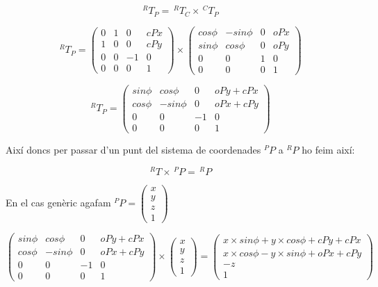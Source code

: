 $$ ^RT_P = \,^RT_C \times \,^CT_P $$

$$ ^RT_P = 
\left( \begin{array}{ccc|c}
0 & 1 &  0 & cPx\\
1 & 0 &  0 & cPy\\
0 & 0 & -1 &   0\\
\hline
0 & 0 &  0 & 1
\end{array} \right) \times
\left( \begin{array}{ccc|c}
cos \phi & -sin \phi &  0 & oPx\\
sin \phi &  cos \phi &  0 & oPy\\
0        &         0 &  1 &   0\\
\hline
0 & 0 &  0 & 1
\end{array} \right) $$

$$ ^RT_P = 
\left( \begin{array}{ccc|c}
sin \phi &  cos \phi &  0 & oPy + cPx\\
cos \phi & -sin \phi &  0 & oPx + cPy\\
0        &         0 & -1 &   0\\
\hline
0 & 0 &  0 & 1
\end{array} \right)$$

Així doncs per passar d'un punt del sistema de coordenades $^PP$ a $^RP$ ho
feim així:

$$^RT \times \,^PP = \,^RP$$

En el cas genèric agafam $^PP = 
\left( \begin{array}{c}
x \\
y \\
z \\
\hline
1
\end{array} \right)$

$$
\left( \begin{array}{ccc|c}
sin \phi &  cos \phi &  0 & oPy + cPx\\
cos \phi & -sin \phi &  0 & oPx + cPy\\
0        &         0 & -1 &   0\\
\hline
0 & 0 &  0 & 1
\end{array} \right)
\times
\left( \begin{array}{c}
x \\
y \\
z \\
\hline
1
\end{array} \right)
=
\left( \begin{array}{c}
x\times sin \phi + y \times cos \phi + cPy + cPx \\
x\times cos \phi - y \times sin \phi + oPx + cPy \\
-z \\
\hline
1
\end{array} \right)
$$


